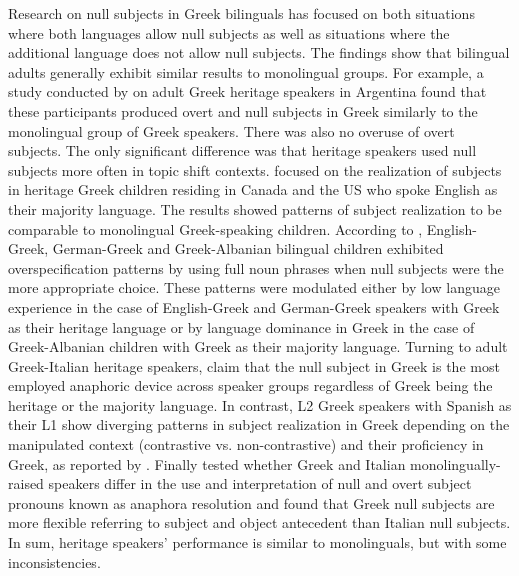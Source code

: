 \documentclass[output=paper,colorlinks,citecolor=brown]{langscibook}
\begin{document}
Research on null subjects in Greek bilinguals has focused on both situations where both languages allow null subjects as well as situations where the additional language does not allow null subjects. The findings show that bilingual adults generally exhibit similar results to monolingual groups. For example, a study conducted by \textcite{giannakou2022journal} on adult Greek heritage speakers in Argentina found that these participants produced overt and null subjects in Greek similarly to the monolingual group of Greek speakers. There was also no overuse of overt subjects. The only significant difference was that heritage speakers used null subjects more often in topic shift contexts. 
\textcite{DaskalakiEtAl2019} focused on the realization of subjects in heritage Greek children residing in Canada and the US who spoke English as their majority language. The results showed patterns of subject realization to be comparable to monolingual Greek-speaking children. According to \textcite{andreou2020effects}, English-Greek, German-Greek and Greek-Albanian bilingual children exhibited overspecification patterns by using full noun phrases when null subjects were the more appropriate choice. These patterns were modulated either by low language experience in the case of English-Greek and German-Greek speakers with Greek as their heritage language or by language dominance in Greek in the case of Greek-Albanian children with Greek as their majority language. Turning to adult Greek-Italian heritage speakers, \textcite{di2019age} claim that the null subject in Greek is the most employed anaphoric device across speaker groups regardless of Greek being the heritage or the majority language. In contrast, L2 Greek speakers with Spanish as their L1 show diverging patterns in subject realization in Greek depending on the manipulated context (contrastive vs. non-contrastive) and their proficiency in Greek, as reported by \textcite{margaza2020null}. Finally \textcite{torregrossa2021bilingual} tested whether Greek and Italian monolingually-raised speakers differ in the use and interpretation of null and overt subject pronouns known as anaphora resolution and found that Greek null subjects are more flexible referring to subject and object antecedent than Italian null subjects.
In sum, heritage speakers' performance is similar to monolinguals, but with some inconsistencies.
\end{document}
